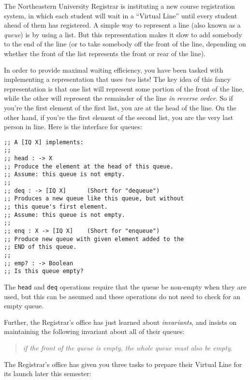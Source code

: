 \documentclass[12pt]{article}                   %
\def\pts#1{\marginpar{\footnotesize \raggedright  \fbox{#1 {\sc Points}}}}
\newcommand\code[1]{\texttt{#1}}
\begin{document}
\begin{problem} \pts{21}

The Northeastern University Registrar is instituting a new course
registration system, in which each student will wait in a ``Virtual
Line'' until every student ahead of them has registered.  A simple way
to represent a line (also known as a \emph{queue}) is by using a list.
But this representation makes it slow to add somebody to the end of
the line (or to take somebody off the front of the line, depending on
whether the front of the list represents the front or rear of the
line).  

In order to provide maximal waiting efficiency, you have been tasked
with implementing a representation that uses \emph{two} lists!  The
key idea of this fancy representation is that one list will represent
some portion of the front of the line, while the other will represent
the remainder of the line \emph{in reverse order}.  So if you're the
first element of the first list, you are at the head of the line.  On
the other hand, if you're the first element of the second list, you
are the very last person in line.
%
Here is the interface for queues:
\begin{verbatim}
;; A [IQ X] implements:
;;
;; head : -> X
;; Produce the element at the head of this queue.
;; Assume: this queue is not empty.
;;
;; deq : -> [IQ X]      (Short for "dequeue")
;; Produces a new queue like this queue, but without 
;; this queue's first element.
;; Assume: this queue is not empty.
;;
;; enq : X -> [IQ X]    (Short for "enqueue")
;; Produce new queue with given element added to the
;; END of this queue.
;;
;; emp? : -> Boolean
;; Is this queue empty?
\end{verbatim}

The \code{head} and \code{deq} operations require that the queue be
non-empty when they are used, but this can be assumed and these
operations do not need to check for an empty queue.

Further, the Registrar's office has just learned about
\emph{invariants}, and insists on maintaining the following invariant
about all of their queues:

\begin{quote}
  {\it if the front of the queue is empty, the whole queue must also be empty.}
\end{quote} 

\noindent
The Registrar's office has given you three tasks to prepare their
Virtual Line for its launch later this semester:


\end{problem}
\end{document}

